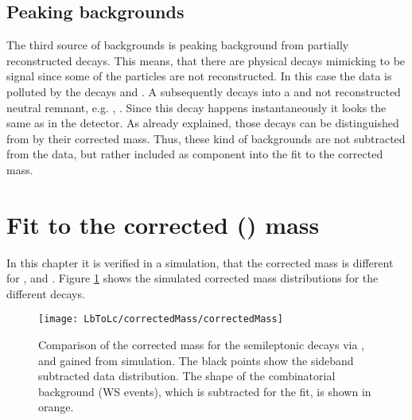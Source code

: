 \subsection{Peaking backgrounds}
The third source of backgrounds is peaking background from partially reconstructed decays.
This means, that there are physical decays mimicking to be signal since some of the particles are not reconstructed.
In this case the \LbToLcmunu data is polluted by the decays  and  \cite{SL_Vub}.
A \Lcstar subsequently decays into a \Lc and not reconstructed neutral remnant, e.g. \piz, \pip\pim.
Since this decay happens instantaneously it looks the same as \LcTopKpi in the detector.
As already explained, those decays can be distinguished from \LbToLcmunu by their corrected \Lb mass.
Thus, these kind of backgrounds are not subtracted from the data, but rather included as component into the fit to the corrected \Lb mass.

\section{Fit to the corrected \pKpi\mun (\Lb) mass}
\label{sec:FitCorrectedMass}
In this chapter it is verified in a simulation, that the corrected \pKpi\mun mass is different for \LbToLcmunu,  and .
Figure \ref{fig:correctedMass_normalisation} shows the simulated corrected \pKpi\mun mass distributions for the different decays.
\begin{figure}[hptb]
	\centering
	\texttt{[image: LbToLc/correctedMass/correctedMass]}
	\caption{Comparison of the \pKpi\mun corrected mass for the semileptonic \Lb decays via \Lc,  and  gained from simulation. The black points show the sideband subtracted data distribution. The shape of the combinatorial \Lc\mun background (WS events), which is
    subtracted for the fit, is shown in orange.}
	\label{fig:correctedMass_normalisation}
\end{figure}

